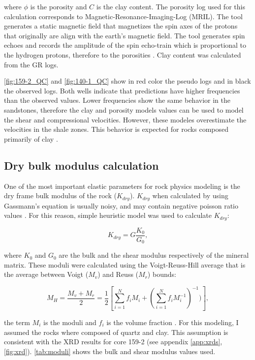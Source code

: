 where $\phi$ is the porosity and $C$ is the clay content. The porosity log used for 
this calculation corresponds to Magnetic-Resonance-Imaging-Log (MRIL). The
tool generates a static magnetic field that magnetizes the spin axes of the protons that 
originally are align with the earth's magnetic field. The tool generates spin echoes
and records the amplitude of the spin echo-train which is proportional to the hydrogen 
protons, therefore to the porosities \citep{ref:george}. Clay content was calculated from
the GR logs.

\ref{fig:159-2_QC} and \ref{fig:140-1_QC} show in red color the pseudo logs and in black the
observed logs. Both wells indicate that predictions have higher frequencies than the
observed values. Lower frequencies show the same behavior in the sandstones, therefore the clay and porosity models
values can be used to model the shear and compressional velocities. However, these modeles overestimate the 
velocities in the shale zones. This behavior is expected for rocks composed primarily of clay \citep{ref:castagna}.  

\subsection{Dry bulk modulus calculation}

One of the most important elastic parameters for rock physics modeling 
is the dry frame bulk modulus of the rock ($K_{dry}$). $K_{dry}$ when calculated by 
using Gassmann's equation is usually noisy, and may contain negative poisson
ratio values \citep{ref:tad}. For this reason, \cite{ref:krief} simple heuristic model
was used to calculate $K_{dry}$:

\begin{equation}
K_{dry}=G \frac{K_{0}}{G_{0}},
  \label{eq:kdry}
\end{equation}

where $K_{0}$ and $G_{0}$ are the bulk and the shear modulus respectively of the mineral matrix. These moduli
were calculated using the Voigt-Reuss-Hill average that is the average between Voigt ($M_{v}$)
and Reuss ($M_{r}$) bounds:

\begin{equation}
M_{H}= \frac{M_{v}+M_{r}}{2}=\frac{1}{2}[\sum_{i=1}^{N}f_{i}M_{i}+(\sum_{i=1}^{N}f_{i}M_{i}^{-1})^{-1})],
  \label{eq:hill}
\end{equation}

the term $M_{i}$ is the moduli and $f_{i}$ is the volume fraction \citep{ref:handbook}. For this modeling,
I assumed the rocks where composed of quartz and clay. This assumption is consistent with the XRD results 
for core 159-2 (see appendix \ref{app:xrds}, \ref{fig:xrd}). \ref{tab:moduli}  shows the bulk and shear modulus values used. 
 
